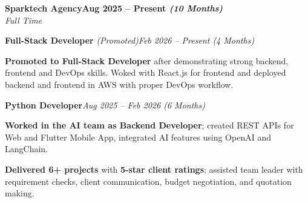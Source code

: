 \documentclass[letterpaper,10pt]{article}
\newcommand{\heading}[2]{
  \hspace{10pt}#1\hfill#2\\
}
\newcommand{\headingBf}[2]{
  \heading{\textbf{#1}}{\textbf{#2}}
}
\newcommand{\headingIt}[2]{
  \heading{\textit{#1}}{\textit{#2}}
}
\newenvironment{resume_list}{
  \vspace{-7pt}
  \begin{itemize}[itemsep=-2px, parsep=1pt, leftmargin=30pt]
}{
  \end{itemize}
}
\begin{document}
  \headingBf{Sparktech Agency}{Aug 2025 -- Present \textit{(10 Months)}}
  \headingIt{Full Time}{}
  \vspace{4pt}

  \hspace{10pt}\hspace{8pt}\textbf{Full-Stack Developer} \textit{(Promoted)}\hfill\textit{Feb 2026 -- Present (4 Months)}\\
  \begin{resume_list}
    \item \textbf{Promoted to Full-Stack Developer} after demonstrating strong backend, frontend and DevOps skills. Woked with React.js for frontend and deployed backend and frontend in AWS with proper DevOps workflow.
  \end{resume_list}
  \vspace{0.15pt}

  \hspace{10pt}\hspace{8pt}\textbf{Python Developer}\hfill\textit{Aug 2025 -- Feb 2026 (6 Months)}\\
  \begin{resume_list}
    \item \textbf{Worked in the AI team as Backend Developer}; created REST APIs for Web and Flutter Mobile App, integrated AI features using OpenAI and LangChain.
    \item \textbf{Delivered 6+ projects} with \textbf{5-star client ratings}; assisted team leader with requirement checks, client communication, budget negotiation, and quotation making.
  \end{resume_list}

\end{document}
